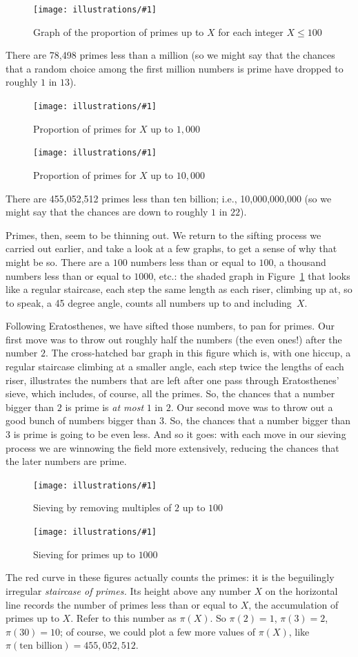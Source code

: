 \documentclass[openany]{book}
\newcommand{\ill}[3]{%
   \begin{figure}[H]%
   \vspace{-2ex}
   \centering%
   \texttt{[image: illustrations/\#1]}%
   \caption{#3}%
   \vspace{-2ex}
    \end{figure}}
\theoremstyle{plain}
\theoremstyle{definition}
\begin{document}
\ill{proportion_primes_100}{1}{Graph of the proportion of primes up to $X$ for each integer $X\leq 100$}

There are 78,498 primes less than a million (so we might say that
the chances that a random choice among the first million numbers is
prime have dropped to roughly $1$ in $13$).

\ill{proportion_primes_1000}{1}{Proportion of primes for $X$ up to $1{,}000$}
\ill{proportion_primes_10000}{1}{Proportion of primes for $X$ up to $10{,}000$}

There are 455,052,512 primes less than ten billion; i.e.,
10{,}000{,}000{,}000 (so we might say that the chances are down to roughly
$1$ in $22$).

Primes, then, seem to be thinning out.  We return to the sifting process
we carried out earlier, and take a look at a few graphs, to get a sense of why
that might be so. There are a $100$ numbers less than or equal to
$100$, a thousand numbers less than or equal to $1000$, etc.: the
shaded graph in Figure~\ref{fig:sieve_2_100} that looks like a regular staircase, each step the
same length as each riser, climbing up at, so to speak, a 45 degree
angle, counts all numbers up to and including~$X$.

Following Eratosthenes, we have sifted those numbers, to pan for
primes. Our first move was to throw out roughly half the numbers (the
even ones!) after the number $2$. The cross-hatched bar graph in this
figure which is, with one hiccup, a regular staircase climbing at a
smaller angle, each step twice the lengths of each riser, illustrates
the numbers that are left after one pass through Eratosthenes' sieve,
which includes, of course, all the primes. So, the chances that a
number bigger than $2$ is prime is {\em at most} $1$ in $2$.  Our
second move was to throw out a good bunch of numbers bigger than $3$.
So, the chances that a number bigger than $3$ is prime is going to be
even less.  And so it goes: with each move in our
sieving process we are winnowing the field more extensively, reducing
the chances that the later numbers are prime.

\ill{sieve_2_100}{.9}{Sieving by removing multiples of $2$ up to $100$\label{fig:sieve_2_100}}
\ill{sieve1000}{.9}{Sieving for primes up to $1000$}

The red curve in these figures actually counts the primes: it is the
beguilingly irregular {\em staircase of primes.}  Its height above any
number $X$ on the horizontal line records the number of primes less
than or equal to $X$, the accumulation of primes up to $X$.  Refer to
this number as $\pi(X)$. So $\pi(2)=1$, $\pi(3) = 2$, $\pi(30) = 10$;
of course, we could plot a few more values of $\pi(X)$, like
$\pi(\text{ten billion}) = 455,052,512$.
\end{document}

